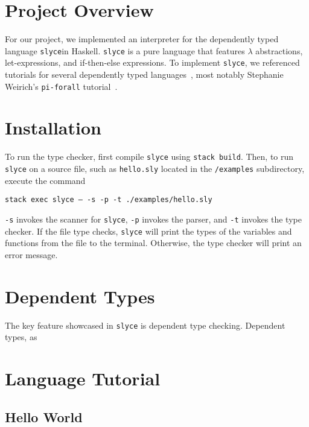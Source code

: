 \section{Project Overview}
For our project, we implemented an interpreter for the dependently typed language \texttt{slyce}\footnotemark in Haskell.
\texttt{slyce} is a pure language that features $\lambda$ abstractions, let-expressions, and if-then-else expressions.
To implement \texttt{slyce}, we referenced tutorials for several dependently typed languages~\cite{friedman2018little, loh2010tutorial}, most notably Stephanie Weirich's \texttt{pi-forall} tutorial~\cite{weirich2022implementing}.


\section{Installation}
To run the type checker, first compile \texttt{slyce} using \texttt{stack build}. 
Then, to run \texttt{slyce} on a source file, such as \texttt{hello.sly} located in the \texttt{/examples} subdirectory, execute the command\newline\centerline{\texttt{stack exec slyce -- -s -p -t ./examples/hello.sly}}\newline
\texttt{-s} invokes the scanner for \texttt{slyce}, \texttt{-p} invokes the parser, and \texttt{-t} invokes the type checker. 
If the file type checks, \texttt{slyce} will print the types of the variables and functions from the file to the terminal.
Otherwise, the type checker will print an error message. 

\section{Dependent Types}
The key feature showcased in \texttt{slyce} is dependent type checking. 
Dependent types, as 

\section{Language Tutorial}
\subsection{Hello World}
